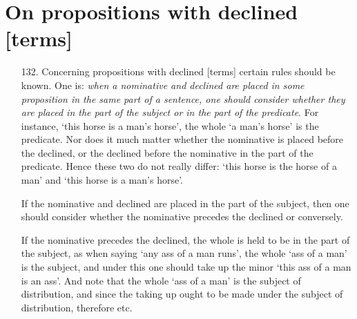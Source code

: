 \section{On propositions with declined [terms]}
\begin{itemize}
\item[132.] Concerning propositions with declined [terms] certain rules should be known. One is: \textit{when a nominative and declined are placed in some proposition in the same part of a sentence, one should consider whether they are placed in the part of the subject or in the part of the predicate}. For instance, `this horse is a man's horse', the whole `a man's horse' is the predicate. Nor does it much matter whether the nominative is placed before the declined, or the declined before the nominative in the part of the predicate. Hence these two do not really differ: `this horse is the horse of a man' and `this horse is a man's horse'. 

If the nominative and declined are placed in the part of the subject, then one should consider whether the nominative precedes the declined or conversely. 

If the nominative precedes the declined, the whole is held to be in the part of the subject, as when saying `any ass of a man runs', the whole `ass of a man' is the subject, and under this one should take up the minor `this ass of a man is an ass'. And note that the whole `ass of a man' is the subject of distribution, and since the taking up ought to be made under the subject of distribution, therefore etc. 


\end{itemize}
